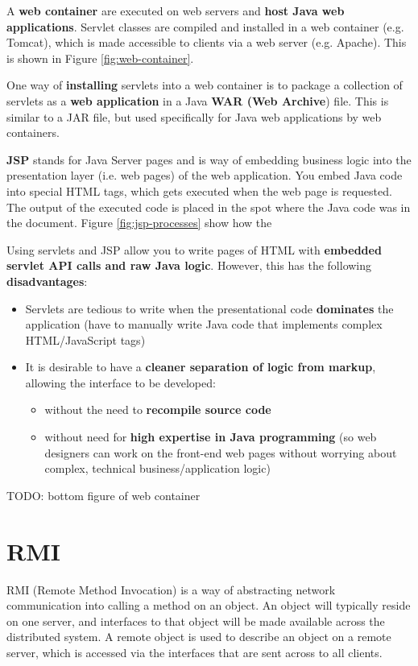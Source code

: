 \documentclass{article}
\begin{document}
A \textbf{web container} are executed on web servers and \textbf{host Java web applications}. Servlet classes are compiled and installed in a web container (e.g. Tomcat), which is made accessible to clients via a web server (e.g. Apache). This is shown in Figure \ref{fig:web-container}.

One way of \textbf{installing} servlets into a web container is to package a collection of servlets as a \textbf{web application} in a Java \textbf{WAR (Web Archive}) file. This is similar to a JAR file, but used specifically for Java web applications by web containers.

\textbf{JSP} stands for Java Server pages and is way of embedding business logic into the presentation layer (i.e. web pages) of the web application. You embed Java code into special HTML tags, which gets executed when the web page is requested. The output of the executed code is placed in the spot where the Java code was in the document. Figure \ref{fig:jsp-processes} show how the

Using servlets and JSP allow you to write pages of HTML with \textbf{embedded servlet API calls and raw Java logic}. However, this has the following \textbf{disadvantages}:
\begin{itemize}
	\item Servlets are tedious to write when the presentational code \textbf{dominates} the application (have to manually write Java code that implements complex HTML/JavaScript tags)
	\item It is desirable to have a \textbf{cleaner separation of logic from markup}, allowing the interface to be developed:
	\begin{itemize}
		\item without the need to \textbf{recompile source code}
		\item without need for \textbf{high expertise in Java programming} (so web designers can work on the front-end web pages without worrying about complex, technical business/application logic)
	\end{itemize}
\end{itemize}

TODO: bottom figure of web container

\section{RMI}

RMI (Remote Method Invocation) is a way of abstracting network communication into calling a method on an object. An object will typically reside on one server, and interfaces to that object will be made available across the distributed system. A remote object is used to describe an object on a remote server, which is accessed via the interfaces that are sent across to all clients. 
\end{document}
